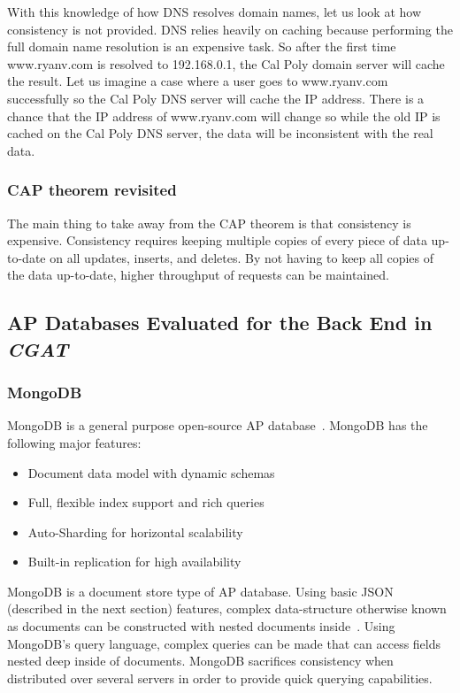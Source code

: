 \documentclass[12pt]{ucthesis}
\begin{document}
With this knowledge of how DNS resolves domain names, let us look at how consistency is not provided. DNS relies
heavily on caching because performing the full domain name resolution is an expensive task. So after the first
time www.ryanv.com is resolved to 192.168.0.1, the Cal Poly domain server will cache the result. Let us imagine
a case where a user goes to www.ryanv.com successfully so the Cal Poly DNS server will cache the IP address.
There is a chance that the IP address of www.ryanv.com will change so while the old IP is cached on the
Cal Poly DNS server, the data will be inconsistent with the real data. 



\subsubsection{CAP theorem revisited}
The main thing to take away from the CAP theorem is that consistency is expensive. Consistency
requires keeping multiple copies of every piece of data up-to-date on all updates, inserts, and deletes.
By not having to keep all copies of the data up-to-date, higher throughput of requests can be maintained.


\subsection{AP Databases Evaluated for the Back End in \textit{CGAT}}

\subsubsection{MongoDB}
MongoDB is a general purpose open-source AP database~\cite{mongodb}. MongoDB has the following major features:
\begin{itemize}
\item Document data model with dynamic schemas
\item Full, flexible index support and rich queries
\item Auto-Sharding for horizontal scalability
\item Built-in replication for high availability
\end{itemize}

MongoDB is a document store type of AP database. Using basic JSON (described in the next section) features, complex data-structure otherwise known as documents can be constructed with nested documents inside~\cite{mongodb}. Using MongoDB's query language, complex queries can be made that can access fields nested deep inside of documents. MongoDB sacrifices consistency when distributed over several servers in order to provide quick querying capabilities.
\end{document}
